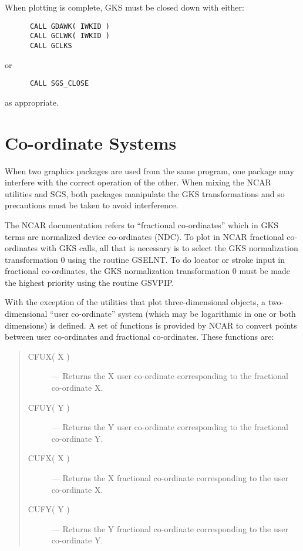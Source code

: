 When plotting is complete, GKS must be closed down with either:

\begin{verbatim}
      CALL GDAWK( IWKID )
      CALL GCLWK( IWKID )
      CALL GCLKS
\end{verbatim}

or

\begin{verbatim}
      CALL SGS_CLOSE
\end{verbatim}

as appropriate.


\section{Co-ordinate Systems} \label{co-ord_sect}

When two graphics packages are used from the same program, one package may
interfere with the correct operation of the other. 
When mixing the NCAR
utilities and SGS, both packages manipulate the GKS transformations and
so precautions must be taken to avoid interference.

The NCAR documentation refers to ``fractional co-ordinates'' which in
GKS terms are normalized device co-ordinates (NDC). 
To plot in NCAR fractional co-ordinates with GKS calls, all that is 
necessary is to select the GKS normalization transformation 0 using the 
routine GSELNT. 
To do locator or stroke input in fractional co-ordinates, the GKS normalization 
transformation 0 must be made the highest priority using the routine 
GSVPIP.

With the exception of the utilities that plot three-dimensional objects, a 
two-dimensional ``user co-ordinate'' system (which may be logarithmic in one or
both dimensions) is defined. 
A set of functions is provided by NCAR to convert points between user
co-ordinates and fractional co-ordinates.
These functions are:

\begin{quote}
\begin{description}
\item [CFUX( X )] ---
 Returns the X user co-ordinate corresponding to the fractional co-ordinate X.
\item [CFUY( Y )] ---
 Returns the Y user co-ordinate corresponding to the fractional co-ordinate Y.
\item [CUFX( X )] ---
 Returns the X fractional co-ordinate corresponding to the user co-ordinate X.
\item [CUFY( Y )] ---
 Returns the Y fractional co-ordinate corresponding to the user co-ordinate Y.
\end{description}
\end{quote}

